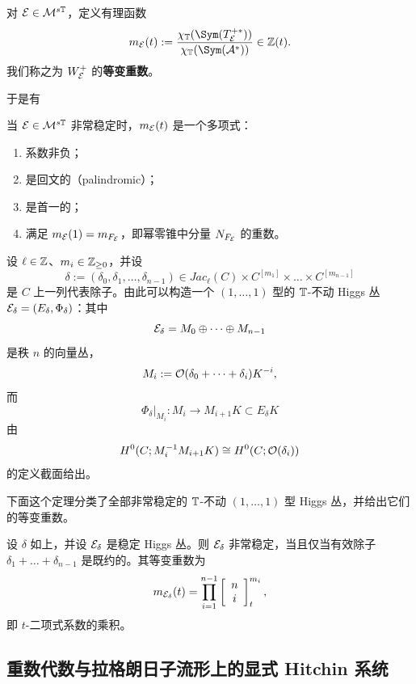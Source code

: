 \begin{definition}\label{equmult}
对 ${\mathcal E}\in {\mathcal{M}}^{s{\mathbb{T}}}$，定义有理函数
\[
m_{\calE}(t):=\frac{\chi_\T(\Sym(T^{+*}_\calE))}{\chi_\T(\Sym(\calA^*))}\in \Z(t).
\]
我们称之为 $W^+_{\mathcal E}$ 的\textbf{等变重数}。
\end{definition}

于是有

\begin{theorem}\label{eqmul}
当 ${\mathcal E}\in {\mathcal{M}}^{s{\mathbb{T}}}$ 非常稳定时，$m_{{\mathcal E}}(t)$ 是一个多项式：\begin{enumerate}\item 系数非负；\item 是回文的（palindromic）；\item 是首一的；\item 满足 $m_{{\mathcal E}}(1)=m_{F_{\mathcal E}}$，即幂零锥中分量 $N_{F_{\mathcal E}}$ 的重数。\end{enumerate}
\end{theorem}

设 $\ell\in \mathbb{Z}$、$m_i\in \mathbb{Z}_{\geq 0}$，并设
\[
\delta:=(\delta_0,\delta_1,\dots,\delta_{n-1})\in Jac_\ell(C)\times C^{[m_1]}\times \dots \times C^{[m_{n-1}]}
\]
是 $C$ 上一列代表除子。由此可以构造一个 $(1,\dots,1)$ 型的 ${\mathbb{T}}$-不动 Higgs 丛 ${\mathcal E}_\delta=(E_\delta,\Phi_\delta)$：其中
\[
{\mathcal E}_\delta=M_0\oplus\dots \oplus M_{n-1}
\]
是秩 $n$ 的向量丛，
\[
M_i:={\mathcal O}(\delta_0+\dots+\delta_i)K^{-i},
\]
而
\[
\Phi_\delta|_{M_i}:M_i\to M_{i+1}K\subset E_\delta K
\]
由
\[
H^0(C;M_i^{-1}M_{i+1}K)\cong H^0(C;{\mathcal O}(\delta_i))
\]
的定义截面给出。

下面这个定理分类了全部非常稳定的 ${\mathbb{T}}$-不动 $(1,\dots,1)$ 型 Higgs 丛，并给出它们的等变重数。

\begin{theorem}\label{mult111}
设 $\delta$ 如上，并设 ${\mathcal E}_\delta$ 是稳定 Higgs 丛。则 ${\mathcal E}_\delta$ 非常稳定，当且仅当有效除子 $\delta_1+\dots+\delta_{n-1}$ 是既约的。其等变重数为
\[
m_{{\mathcal E}_\delta}(t)=\prod_{i=1}^{n-1}\left[\begin{array}{c} n \\ i \end{array}\right]^{m_i}_t,
\]
即 $t$-二项式系数的乘积。
\end{theorem}

\subsection{重数代数与拉格朗日子流形上的显式 Hitchin 系统}


